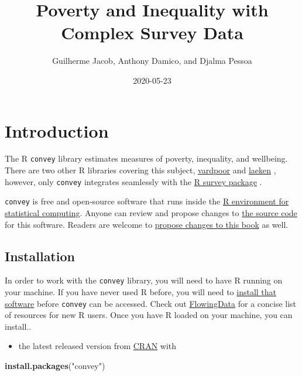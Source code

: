 \documentclass[]{book}
\title{Poverty and Inequality with Complex Survey Data}
\author{Guilherme Jacob, Anthony Damico, and Djalma Pessoa}
\date{2020-05-23}
\newenvironment{Shaded}{\begin{snugshade}}{\end{snugshade}}
\newcommand{\KeywordTok}[1]{\textcolor[rgb]{0.13,0.29,0.53}{\textbf{#1}}}
\newcommand{\NormalTok}[1]{#1}
\newcommand{\StringTok}[1]{\textcolor[rgb]{0.31,0.60,0.02}{#1}}
\providecommand{\tightlist}{%
  \setlength{\itemsep}{0pt}\setlength{\parskip}{0pt}}
\begin{document}
\maketitle

{
\setcounter{tocdepth}{1}
\tableofcontents
}
\hypertarget{introduction}{%
\chapter{Introduction}\label{introduction}}

The R \texttt{convey} library estimates measures of poverty, inequality, and wellbeing. There are two other R libraries covering this subject, \href{https://CRAN.R-project.org/package=vardpoor}{vardpoor} \citep{R-vardpoor} and \href{https://CRAN.R-project.org/package=laeken}{laeken} \citep{R-laeken}, however, only \texttt{convey} integrates seamlessly with the \href{https://CRAN.R-project.org/package=survey}{R survey package} \citep{R-survey-article, R-survey-book, R-survey}.

\texttt{convey} is free and open-source software that runs inside the \href{https://www.r-project.org/}{R environment for statistical computing}. Anyone can review and propose changes to \href{https://github.com/DjalmaPessoa/convey}{the source code} for this software. Readers are welcome to \href{https://github.com/guilhermejacob/context/}{propose changes to this book} as well.

\hypertarget{install}{%
\section{Installation}\label{install}}

In order to work with the \texttt{convey} library, you will need to have R running on your machine. If you have never used R before, you will need to \href{https://www.r-project.org/}{install that software} before \texttt{convey} can be accessed. Check out \href{http://flowingdata.com/2012/06/04/resources-for-getting-started-with-r/}{FlowingData} for a concise list of resources for new R users. Once you have R loaded on your machine, you can install..

\begin{itemize}
\tightlist
\item
  the latest released version from \href{https://CRAN.R-project.org/package=convey}{CRAN} with
\end{itemize}

\begin{Shaded}
\begin{Highlighting}[]
\KeywordTok{install.packages}\NormalTok{(}\StringTok{"convey"}\NormalTok{)}
\end{Highlighting}
\end{Shaded}
\end{document}
